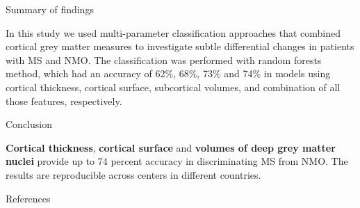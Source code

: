 \documentclass[final]{beamer}
\newlength{\onecolwid}
\begin{document}
\begin{frame}[t]
\begin{columns}[t]
\begin{column}{\onecolwid}
\begin{block}{Summary of findings}

In this study we used multi-parameter classification approaches that combined cortical grey matter measures to investigate subtle differential changes in patients with MS and NMO. The classification was performed with random forests 
method, which had an accuracy of 62\%, 68\%, 73\% and 74\% in models using  cortical thickness, cortical surface, subcortical volumes, and combination of all those features, respectively. 
\end{block}


\begin{alertblock}{Conclusion}

\textbf{Cortical thickness}, \textbf{cortical surface} and \textbf{volumes of deep grey matter nuclei} provide up to 74 percent accuracy in discriminating MS from NMO. The results are reproducible across centers in different countries.

\end{alertblock} 


\begin{block}{References}

\nocite{*} %
\small{
\vspace{0.6in}}

\end{block}




\end{column} %

\end{columns} %

\end{frame} %
\end{document}
